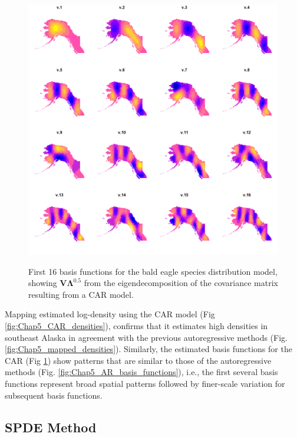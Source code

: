 \begin{figure}[!ht]
    \caption[Example of basis functions for CAR model]{First 16 basis functions for the bald eagle species distribution model, showing \( \mathbf{V \Lambda}^{0.5} \) from the eigendecomposition of the covariance matrix resulting from a CAR model.}
    \centering
    \includegraphics[width=5.5in]{Chap_5/Mapped_CAR_basis_functions.png}
    \label{fig:Chap5_CAR_basis_functions}
\end{figure}

Mapping estimated log-density using the CAR model (Fig \ref{fig:Chap5_CAR_densities}), confirms that it estimates high densities in southeast Alaska in agreement with the previous autoregressive methods (Fig. \ref{fig:Chap5_mapped_densities}).  Similarly, the estimated basis functions for the CAR (Fig \ref{fig:Chap5_CAR_basis_functions}) show patterns that are similar to those of the autoregressive methods (Fig. \ref{fig:Chap5_AR_basis_functions}), i.e., the first several basis functions represent broad spatial patterns followed by finer-scale variation for subsequent basis functions.    

\subsection{SPDE Method} \label{sec:Chap5_SPDE}

